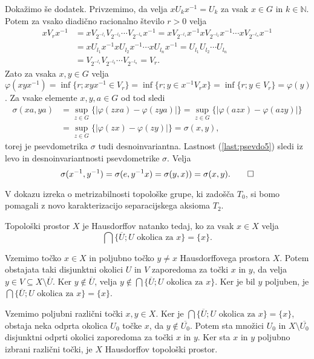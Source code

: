 \documentclass[mat1]{fmfdelo}
\newcommand{\N}{\mathbb N}
\newcommand{\closure}[1]{\overline{#1}}
\begin{document}
\begin{dokaz}
Dokažimo še dodatek. Privzemimo, da velja $xU_kx^{-1} = U_k$ za vsak $x \in G$ in $k \in \N$. Potem za vsako diadično racionalno število $r > 0$ velja
\begin{align*}
xV_rx^{-1} &= xV_{2^{-l_1}}V_{2^{-l_2}}\cdots V_{2^{-l_n}}x^{-1} = xV_{2^{-l_1}}x^{-1}xV_{2^{-l_2}}x^{-1}\cdots xV_{2^{-l_n}}x^{-1} \\
&= xU_{l_1}x^{-1}xU_{l_2}x^{-1}\cdots xU_{l_n}x^{-1} = U_{l_1}U_{l_2}\cdots U_{l_n} \\ 
&= V_{2^{-l_1}}V_{2^{-l_2}}\cdots V_{2^{-l_n}} = V_r.
\end{align*}
Zato za vsaka $x, y \in G$ velja $\varphi(xyx^{-1}) = \inf\lbrace r ; xyx^{-1} \in V_r \rbrace = \inf\lbrace r ; y \in x^{-1}V_rx \rbrace = \inf\lbrace r ; y \in V_r \rbrace = \varphi(y)$.
Za vsake elemente $x, y, a \in G$ od tod sledi
\begin{align*}
\sigma(xa, ya) &= \sup_{z \in G}\lbrace |\varphi(zxa) - \varphi(zya)| \rbrace = \sup_{z \in G}\lbrace |\varphi(azx) - \varphi(azy)| \rbrace \\
&= \sup_{z \in G}\lbrace |\varphi(zx) - \varphi(zy)| \rbrace = \sigma(x, y),
\end{align*}
torej je psevdometrika $\sigma$ tudi desnoinvariantna.
Lastnost (\ref{last:psevdo5}) sledi iz levo in desnoinvariantnosti psevdometrike $\sigma$. Velja
\[ \sigma(x^{-1}, y^{-1}) = \sigma(e, y^{-1}x) = \sigma(y, x) ) = \sigma(x, y). \qedhere\]
\end{dokaz}

V dokazu izreka o metrizabilnosti topološke grupe, ki zadošča $T_0$, si bomo pomagali z novo karakterizacijo separacijskega aksioma $T_2$.
\begin{trditev}\label{trd:hauskar}
Topološki prostor $X$ je Hausdorffov natanko tedaj, ko za vsak $x \in X$ velja
\[ \bigcap\lbrace \closure{U} ; U \text{ okolica za } x \rbrace = \lbrace x \rbrace. \]
\end{trditev}

\begin{dokaz}
Vzemimo točko $x \in X$ in poljubno točko $y \neq x$ Hausdorffovega prostora $X$. Potem obstajata taki disjunktni okolici $U$ in $V$ zaporedoma za točki $x$ in $y$, da velja $y \in V \subseteq X\setminus \closure{U}$. Ker $y \notin \closure{U}$, velja $y \notin \bigcap\lbrace \closure{U} ; U \text{ okolica za } x \rbrace$. Ker je bil $y$ poljuben, je $\bigcap\lbrace \closure{U} ; U \text{ okolica za } x \rbrace = \lbrace x \rbrace$.

Vzemimo poljubni različni točki $x, y \in X$. Ker je $\bigcap\lbrace \closure{U} ; U \text{ okolica za } x \rbrace = \lbrace x \rbrace$, obstaja neka odprta okolica $U_0$ točke $x$, da $y \notin \closure{U_0}$. Potem sta množici $U_0$ in $X \setminus \closure{U_0}$ disjunktni odprti okolici zaporedoma za točki $x$ in $y$. Ker sta $x$ in $y$ poljubno izbrani različni točki, je $X$ Hausdorffov topološki prostor.
\end{dokaz}
\end{document}
